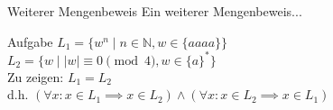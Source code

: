 %
%
%
%

\begin{frame}{Weiterer Mengenbeweis}
    Ein weiterer Mengenbeweis...
    \begin{block}{\alert{Aufgabe}}
    $L_1=\{w^{n} \mid n \in \mathbb{N}, w \in \{aaaa\}\}$\\
    $L_2=\{w \mid |w| \equiv 0 \pmod 4, w \in \{a\}^*\}$\\
    Zu zeigen:
    $L_1 = L_2$\\
    d.h. $(\forall x: x \in L_1 \implies x \in L_2) \wedge (\forall x: x \in L_2 \implies x \in L_1)$
    \end{block}

\end{frame}

